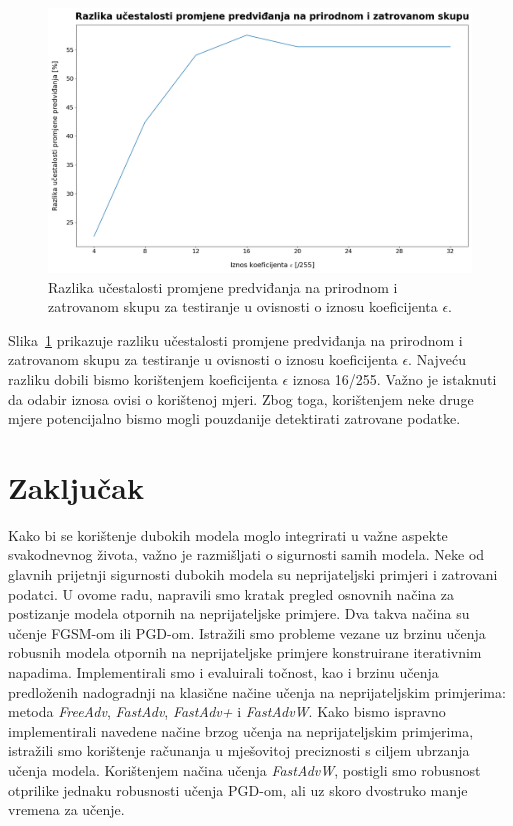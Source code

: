 \documentclass[times, utf8, zavrsni, numeric]{fer}
\begin{document}
\pagebreak

\begin{figure}[htb]
    \centering
    \includegraphics[scale=0.355]{../poisoned_stats/change_of_predictions_difference_double.png}
    \caption{Razlika učestalosti promjene predviđanja na prirodnom i zatrovanom skupu za testiranje u ovisnosti o iznosu koeficijenta $\epsilon$.}
    \label{fig:change_of_predictions_difference}
\end{figure}

Slika~\ref{fig:change_of_predictions_difference} prikazuje razliku učestalosti promjene predviđanja na prirodnom i zatrovanom skupu za testiranje u ovisnosti o iznosu koeficijenta $\epsilon$.
Najveću razliku dobili bismo korištenjem koeficijenta $\epsilon$ iznosa 16/255. Važno je istaknuti da odabir iznosa ovisi o korištenoj mjeri. Zbog toga, korištenjem neke druge mjere potencijalno bismo mogli pouzdanije detektirati zatrovane podatke.

\chapter{Zaključak}

Kako bi se korištenje dubokih modela moglo integrirati u važne aspekte svakodnevnog života, važno je razmišljati o sigurnosti samih modela. 
Neke od glavnih prijetnji sigurnosti dubokih modela su neprijateljski primjeri i zatrovani podatci.
U ovome radu, napravili smo kratak pregled osnovnih načina za postizanje modela otpornih na neprijateljske primjere. Dva takva načina su učenje FGSM-om ili PGD-om.
Istražili smo probleme vezane uz brzinu učenja robusnih modela otpornih na neprijateljske primjere konstruirane iterativnim napadima.
Implementirali smo i evaluirali točnost, kao i brzinu učenja predloženih nadogradnji na klasične načine učenja na neprijateljskim primjerima: metoda \textit{FreeAdv}, \textit{FastAdv}, \textit{FastAdv+} i \textit{FastAdvW}.
Kako bismo ispravno implementirali navedene načine brzog učenja na neprijateljskim primjerima, istražili smo korištenje računanja u mješovitoj preciznosti s ciljem ubrzanja učenja modela.
Korištenjem načina učenja \textit{FastAdvW}, postigli smo robusnost otprilike jednaku robusnosti učenja PGD-om, ali uz skoro dvostruko manje vremena za učenje.
\end{document}
